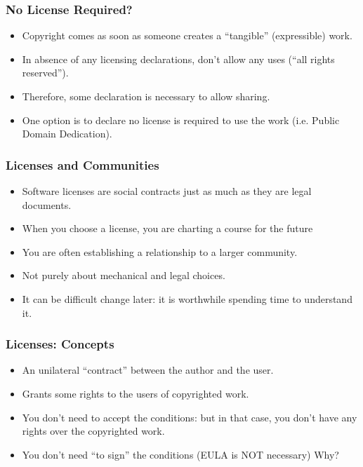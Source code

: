 \documentclass{beamer}
\begin{document}

\begin{frame}
\frametitle{No License Required?}

\begin{itemize}
\item Copyright comes as soon as someone creates a ``tangible'' (expressible) work.
\item In absence of any licensing declarations, don't allow any uses (``all rights reserved'').
\item Therefore, some declaration is necessary to allow sharing.
\item One option is to declare no license is required to use the work (i.e. \alert{Public Domain Dedication}). 
\end{itemize}

\end{frame}


\begin{frame}
\frametitle{Licenses and Communities}

\begin{itemize}
\item Software licenses are social contracts just as much as they are legal documents.
\item When you choose a license, you are charting a course for the future
\item You are often establishing a relationship to a larger community.
\item Not purely about mechanical and legal choices.
\item It can be difficult change later: it is worthwhile spending time to understand it.
\end{itemize}

\end{frame}


\begin{frame}
\frametitle{Licenses: Concepts}

\begin{itemize}
\item An unilateral ``contract'' between the author and the user.
\item Grants some rights to the users of copyrighted work.
\item You don't need to accept the conditions: but in that case, you don't have any rights over the copyrighted work. 
\item You don't need ``to sign'' the conditions (EULA is \alert{NOT} necessary) Why?
\end{itemize}

\end{frame}
\end{document}
